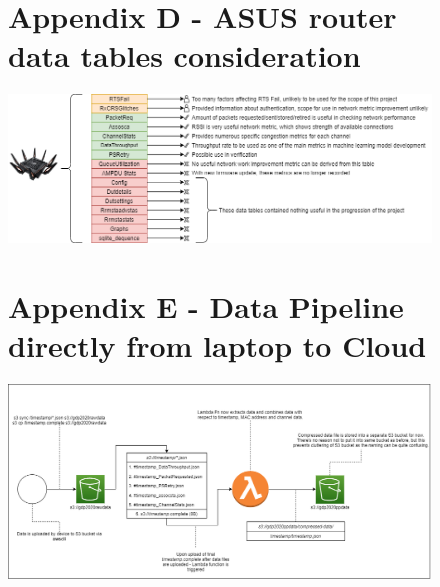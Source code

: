 \begin{landscape}
\begin{figure}[ht]
\begin{minipage}{\linewidth}
\section{Appendix D - ASUS router data tables consideration}

   \centering
    \includegraphics[width=0.99\linewidth]{pages/Chapter3/Chapter 3 images/router_data-Datasets-Usefulness.png}
    
    \label{appendix:ASUS router datatable}

\end{minipage}
\end{figure}
    \end{landscape}
    
    
\begin{landscape}
\begin{figure}[ht]
\begin{minipage}{\linewidth}
\section{Appendix E - Data Pipeline directly from laptop to Cloud}

   \centering
    \includegraphics[width=0.99\linewidth]{pages/Chapter3/Chapter 3 images/S3_to_Lambda_to_S3.png}
    
    \label{appendix:data_flow_from_laptop_to_cloud}

\end{minipage}
\end{figure}
    \end{landscape}
    
